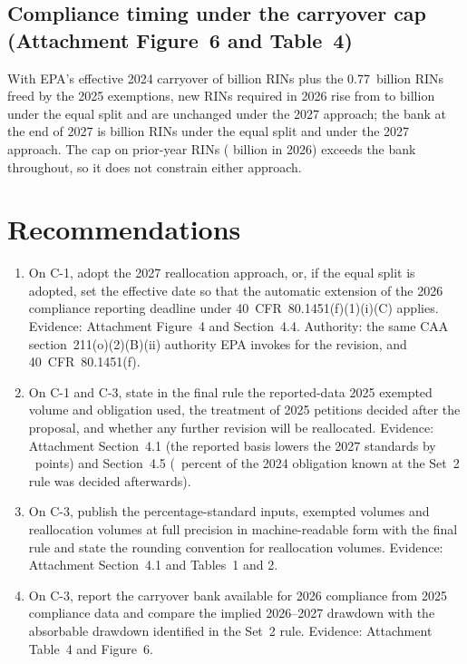 \documentclass[11pt]{article}
\newcommand{\AttFigTradeoff}{4}
\newcommand{\AttFigCarryover}{6}
\newcommand{\AttTabInputs}{1}
\newcommand{\AttTabReconstruction}{2}
\newcommand{\AttTabAccounting}{4}
\newcommand{\AttSecReconstruction}{4.1}
\newcommand{\AttSecDeadlines}{4.4}
\newcommand{\AttSecBacktest}{4.5}
\begin{document}
\subsection{Compliance timing under the carryover cap (Attachment Figure~\AttFigCarryover{} and \mbox{Table~\AttTabAccounting})}
With EPA's effective 2024 carryover of \valbankRia{} billion RINs plus the 0.77~billion RINs freed by the 2025 exemptions, new RINs required in 2026 rise from \valnewRinsFirstSetTwo{} to \valnewRinsFirstEqual{} billion under the equal split and are unchanged under the 2027 approach; the bank at the end of 2027 is \valbankOutSecondEqual{} billion RINs under the equal split and \valbankOutSecondAllTwoZeroTwoSeven{} under the 2027 approach. The cap on prior-year RINs (\valcapFirstSetTwo{} billion in 2026) exceeds the bank throughout, so it does not constrain either approach.

\section{Recommendations}

\begin{enumerate}
\item On C-1, adopt the 2027 reallocation approach, or, if the equal split is adopted, set the effective date so that the automatic extension of the 2026 compliance reporting deadline under 40~CFR~80.1451(f)(1)(i)(C) applies. Evidence: Attachment Figure~\AttFigTradeoff{} and Section~\AttSecDeadlines. Authority: the same CAA section~211(o)(2)(B)(ii) authority EPA invokes for the revision, and 40~CFR~80.1451(f).
\item On C-1 and C-3, state in the final rule the reported-data 2025 exempted volume and obligation used, the treatment of 2025 petitions decided after the proposal, and whether any further revision will be reallocated. Evidence: Attachment Section~\AttSecReconstruction{} (the reported basis lowers the 2027 standards by \valreportedBasisMaxChangePoints~points) and Section~\AttSecBacktest{} (\vallaterShareTwoZeroTwoFourPct~percent of the 2024 obligation known at the Set~2 rule was decided afterwards).
\item On C-3, publish the percentage-standard inputs, exempted volumes and reallocation volumes at full precision in machine-readable form with the final rule and state the rounding convention for reallocation volumes. Evidence: Attachment Section~\AttSecReconstruction{} and Tables~\AttTabInputs{} and \AttTabReconstruction.
\item On C-3, report the carryover bank available for 2026 compliance from 2025 compliance data and compare the implied 2026--2027 drawdown with the absorbable drawdown identified in the Set~2 rule. Evidence: Attachment Table~\AttTabAccounting{} and Figure~\AttFigCarryover.
\end{enumerate}
\end{document}
